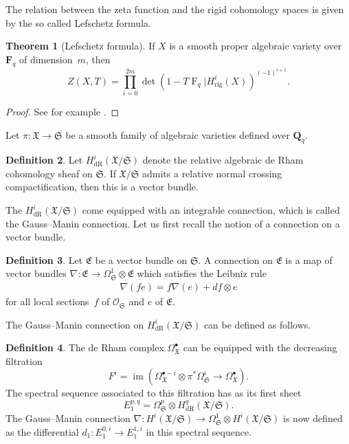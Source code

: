 \documentclass[a4paper,11pt]{article}
\numberwithin{equation}{section}
\newcommand{\QQ}{\mathbf{Q}} %
\newcommand{\FF}{\mathbf{F}} %
\DeclareMathOperator{\fIm}{im}       %
\DeclareMathOperator{\Frob}{F}           %
\providecommand{\HdR}{H_{\text{dR}}}    %
\providecommand{\Hrig}{H_{\text{rig}}}  %
\theoremstyle{definition}
\newtheorem{thm}{Theorem}[section]
\newtheorem{defn}[thm]{Definition}
\begin{document}
The relation between the zeta function and the rigid cohomology spaces 
is given by the so called Lefschetz formula.

\begin{thm}[Lefschetz formula] \label{thm:Lefschetz}
If $X$ is a smooth proper algebraic variety over $\FF_q$ of dimension~$m$, 
then 
\[
Z(X,T) = \prod_{i=0}^{2m} \det(1- T \Frob_q | \Hrig^i(X))^{(-1)^{i+1}}.
\]
\end{thm}

\begin{proof}
See for example \citep[Theorem 6.3]{EtesseLeStum1993}.
\end{proof}

Let $\pi:\mathfrak{X} \rightarrow \mathfrak{S}$ be a smooth family of algebraic varieties 
defined over $\QQ_q$.

\begin{defn}
Let $\HdR^i(\mathfrak{X}/\mathfrak{S})$ denote the relative algebraic 
de Rham cohomology sheaf on $\mathfrak{S}$. 
If $\mathfrak{X}/\mathfrak{S}$ admits a relative normal crossing 
compactification, then this is a vector bundle.
\end{defn}

The $\HdR^i(\mathfrak{X}/\mathfrak{S})$ come equipped with an integrable 
connection, which is called the Gauss--Manin connection. Let us first recall 
the notion of a connection on a vector bundle.

\begin{defn}
Let $\mathfrak{E}$ be a vector bundle on $\mathfrak{S}$. A connection on 
$\mathfrak{E}$ is a map of vector bundles 
$\nabla \colon \mathfrak{E} \rightarrow \Omega^1_{\mathfrak{S}} \otimes \mathfrak{E}$
which satisfies the Leibniz rule
\begin{align*}
\nabla(f e)=f\nabla(e)+df \otimes e
\end{align*} 
for all local sections~$f$ of $\mathcal{O}_{\mathfrak{S}}$ and $e$ 
of $\mathfrak{E}$.
\end{defn}

The Gauss--Manin connection on $\HdR^i(\mathfrak{X}/\mathfrak{S})$ can 
be defined as follows.

\begin{defn}
The de Rham complex $\Omega^{\bullet}_{\mathfrak{X}}$ can be equipped 
with the decreasing filtration
\[
F^i=\fIm(\Omega^{\bullet-i}_{\mathfrak{X}} \otimes \pi^* \Omega^i_{\mathfrak{S}} \rightarrow \Omega^{\bullet}_{\mathfrak{X}}). 
\]
The spectral sequence associated to this filtration has as its first sheet 
\[
E_1^{p,q}=\Omega^p_{\mathfrak{S}} \otimes \HdR^q(\mathfrak{X}/\mathfrak{S}).
\]
The Gauss--Manin connection 
$\nabla:H^i(\mathfrak{X}/\mathfrak{S}) \rightarrow \Omega^1_{\mathfrak{S}} \otimes H^i(\mathfrak{X}/\mathfrak{S})$ 
is now defined as the differential $d_1 \colon E_1^{0,i} \rightarrow E_1^{1,i}$ 
in this spectral sequence.
\end{defn}
\end{document}
